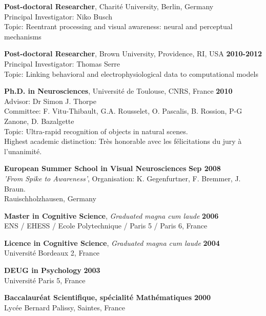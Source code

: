 \documentclass[margin,line]{resume}
\begin{document}
\begin{resume}
    	\textbf{Post-doctoral Researcher}, Charité University, Berlin, Germany\\
    	Principal Investigator: Niko Busch\\
    	Topic: Reentrant processing and visual awareness: neural and perceptual mechanisms 
	\vspace{-1.5mm}
	
	\textbf{Post-doctoral Researcher}, Brown University, Providence, RI, USA \hfill \textbf{2010-2012}\\
	Principal Investigator: Thomas Serre\\
	Topic: Linking behavioral and electrophysiological data to computational models
	\vspace{-1.5mm}
	
    \textbf{Ph.D. in Neurosciences}, Université de Toulouse, CNRS, France \hfill \textbf{2010}\\
	Advisor:  Dr Simon J. Thorpe\\
	Committee: F. Vitu-Thibault, G.A. Rousselet, O. Pascalis, B. Rossion, P-G Zanone, D. Bazalgette\\
	Topic: Ultra-rapid recognition of objects in natural scenes.\\
	Highest academic distinction: Très honorable avec les félicitations du jury à l'unanimité.
	\vspace{-1.5mm}

	\textbf{European Summer School in Visual Neurosciences} \hfill \textbf{Sep 2008}\\
	\textsl{'From Spike to Awareness'}, Organisation: K. Gegenfurtner, F. Bremmer, J. Braun.\\
	Rauischholzhausen, Germany
	\vspace{-1.5mm}

	\textbf{Master in Cognitive Science}, \textsl{Graduated magna cum laude} \hfill \textbf{2006}\\
	ENS / EHESS / Ecole Polytechnique / Paris 5 / Paris 6, France
	\vspace{-1.5mm}

	\textbf{Licence in Cognitive Science}, \textsl{Graduated magna cum laude} \hfill \textbf{2004}\\
	Université Bordeaux 2, France
	\vspace{-1.5mm}
	
	\textbf{DEUG in Psychology} \hfill \textbf{2003}\\
	Université Paris 5, France
	\vspace{-1.5mm}
	
	\textbf{Baccalauréat Scientifique, spécialité Mathématiques} \hfill \textbf{2000}\\
	Lycée Bernard Palissy, Saintes, France


\end{resume}
\end{document}
